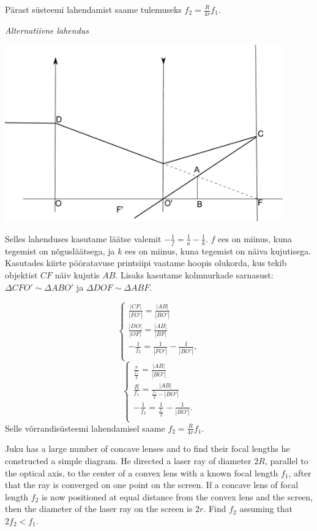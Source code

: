 Pärast süsteemi lahendamist saame tulemuseks $f_2 = \frac{R}{4r}f_1$. 

\vspace{0.5\baselineskip}
\emph{Alternatiivne lahendus}\\

\begin{center}
	\includegraphics[width=0.9\textwidth]{2013-v3g-01-laats_lah3}\\
\end{center}

Selles lahenduses kasutame läätse valemit $-\frac{1}{f} = \frac{1}{a} - \frac{1}{k}$. $f$ ees on miinus, kuna tegemist on nõgusläätsega, ja $k$ ees on miinus, kuna tegemist on näiva kujutisega. Kasutades kiirte pööratavuse printsiipi vaatame hoopis olukorda, kus tekib objektist $CF$ näiv kujutis $AB$. Lisaks kasutame kolmnurkade sarnasust: $\Delta CFO' \sim \Delta ABO'$ ja $\Delta DOF \sim \Delta ABF$.

\[ 
\begin{cases}
\frac{|CF|}{|FO'|} = \frac{|AB|}{|BO'|}\\
\frac{|DO|}{|OF|} = \frac{|AB|}{|BF|}\\
-\frac{1}{f_2} = \frac{1}{|FO'|} - \frac{1}{|BO'|},\\
\end{cases}
\]
\[ 
\begin{cases}
\frac{r}{\frac{f_1}{2}} = \frac{|AB|}{|BO'|}\\
\frac{R}{f_1} = \frac{|AB|}{\frac{f_1}{2} - |BO'|}\\
-\frac{1}{f_2} = \frac{1}{\frac{f_1}{2}} - \frac{1}{|BO'|}.\\
\end{cases}
\]
Selle võrrandisüsteemi lahendamisel saame $f_2 = \frac{R}{4r}f_1$.

Juku has a large number of concave lenses and to find their focal lengths he constructed a simple diagram. He directed a laser ray of diameter $2R$, parallel to the optical axis, to the center of a convex lens with a known focal length $f_1$, after that the ray is converged on one point on the screen. If a concave lens of focal length $f_2$ is now positioned at equal distance from the convex lens and the screen, then the diameter of the laser ray on the screen is $2r$. Find $f_2$ assuming that $2f_2 < f_1$.

